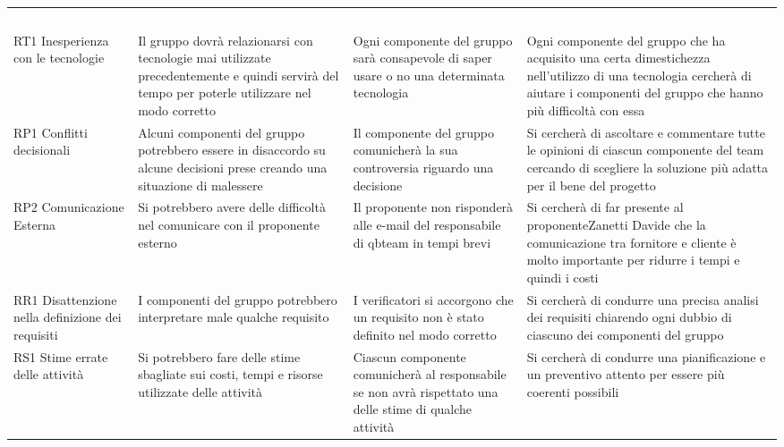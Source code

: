 {
\renewcommand{\arraystretch}{2}
\centering
\begin{longtable}{ C{2cm} C{4.5cm} C{4.5cm} C{4.5cm}}
\textcolor{white}{\textbf{Codice Nome}} & \textcolor{white}{\textbf{Descrizione}} & \textcolor{white}{\textbf{Rilevamento}} &  \textcolor{white}{\textbf{Piano di Contingenza}}\\	

RT1 Inesperienza con le tecnologie & Il gruppo dovrà relazionarsi con tecnologie mai utilizzate precedentemente e quindi servirà del tempo per poterle utilizzare nel modo corretto & Ogni componente del gruppo sarà consapevole di saper usare o no una determinata tecnologia & Ogni componente del gruppo che ha acquisito una certa dimestichezza nell'utilizzo di una tecnologia cercherà di aiutare i componenti del gruppo che hanno più difficoltà con essa \\

RP1 Conflitti decisionali & Alcuni componenti del gruppo potrebbero essere in disaccordo su alcune decisioni prese creando una situazione di malessere & Il componente del gruppo comunicherà la sua controversia riguardo una decisione  & Si cercherà di ascoltare e commentare tutte le opinioni di ciascun componente del team cercando di scegliere la soluzione più adatta per il bene del progetto \\ 

RP2 Comunicazione Esterna & Si potrebbero avere delle difficoltà nel comunicare con il proponente esterno & Il proponente non risponderà alle e-mail del responsabile di qbteam in tempi brevi & Si cercherà di far presente al proponenteZanetti Davide che la comunicazione tra fornitore e cliente è molto importante per ridurre i tempi e quindi i costi \\

RR1 Disattenzione nella definizione dei requisiti & I componenti del gruppo potrebbero interpretare male qualche requisito & I verificatori si accorgono che un requisito non è stato definito nel modo corretto & Si cercherà di condurre una precisa analisi dei requisiti chiarendo ogni dubbio di ciascuno dei componenti del gruppo \\

RS1 Stime errate delle attività & Si potrebbero fare delle stime sbagliate sui costi, tempi e risorse utilizzate delle attività & Ciascun componente comunicherà al responsabile se non avrà rispettato una delle stime di qualche attività & Si cercherà di condurre una pianificazione e un preventivo attento per essere più coerenti possibili \\



\end{longtable}}
